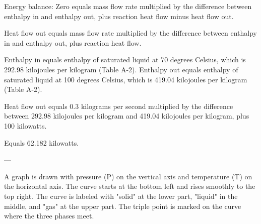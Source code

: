 Energy balance:  
Zero equals mass flow rate multiplied by the difference between enthalpy in and enthalpy out, plus reaction heat flow minus heat flow out.  

Heat flow out equals mass flow rate multiplied by the difference between enthalpy in and enthalpy out, plus reaction heat flow.  

Enthalpy in equals enthalpy of saturated liquid at 70 degrees Celsius, which is 292.98 kilojoules per kilogram (Table A-2).  
Enthalpy out equals enthalpy of saturated liquid at 100 degrees Celsius, which is 419.04 kilojoules per kilogram (Table A-2).  

Heat flow out equals 0.3 kilograms per second multiplied by the difference between 292.98 kilojoules per kilogram and 419.04 kilojoules per kilogram, plus 100 kilowatts.  

Equals 62.182 kilowatts.  

---

A graph is drawn with pressure (P) on the vertical axis and temperature (T) on the horizontal axis. The curve starts at the bottom left and rises smoothly to the top right. The curve is labeled with "solid" at the lower part, "liquid" in the middle, and "gas" at the upper part. The triple point is marked on the curve where the three phases meet.